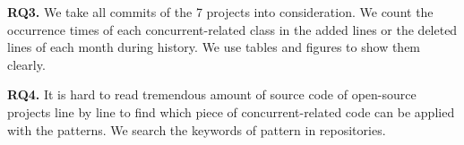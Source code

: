 \textbf{RQ3.} We take all commits of the 7 projects into consideration. We count the occurrence times of each concurrent-related class in the added lines or the deleted lines of each month during history. We use tables and figures to show them clearly.

\textbf{RQ4.} It is hard to read tremendous amount of source code of open-source projects line by line to find which piece of concurrent-related code can be applied with the patterns. We search the keywords of pattern in repositories.



